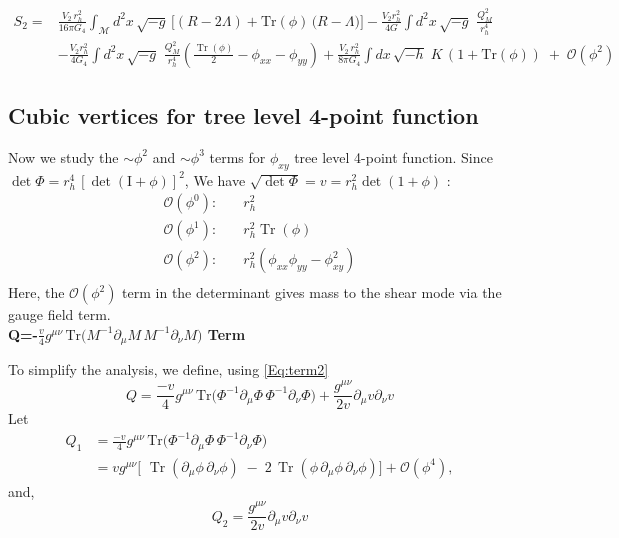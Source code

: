 \documentclass[a4paper,11pt]{article}
\DeclareMathOperator{\Tr}{Tr}
\begin{document}
\begin{equation}
\begin{aligned}
S_2={}&\frac{V_2\,r_h^2}{16\pi G_4}\int_{\mathcal M}d^2x\,\sqrt{-g}\,\Big[(R-2 \Lambda)+\text{Tr}(\phi)\,\Big(R-\Lambda\Big)\Big]-\frac{V_2 r_h^2}{4G}\int d^2x\,\sqrt{-g}\,\, \frac{Q_M^2}{r_h^4}
\\&-\frac{V_2 r_h^2}{4G_4}\int d^2x\,\sqrt{-g}\,\, \frac{Q_M^2}{r_h^4}(\frac{\Tr(\phi)}{2}-  \phi_{xx}-\phi_{yy})+\frac{V_2\,r_h^2}{8\pi G_4}\int dx\,\sqrt{-h}\;K\,(1+\text{Tr}(\phi))\;   +\;\mathcal O(\phi^2)
\end{aligned}
\label{eq:KK-S2-lin}
\end{equation}

\subsection{Cubic vertices for tree level 4-point function}

Now we study the $\sim\phi^2$ and $\sim\phi^3$ terms for $\phi_{xy}$ tree level 4-point function. Since $\det\Phi=r_h^4\,[\det(\mathrm{I}+\phi)]^2$, We have $\sqrt{\det\Phi}=v=r_h^2\det(1+\phi)$ :
\begin{align}
\mathcal O(\phi^0):&\quad r_h^2 \label{eq:KK-sqrtdet-0}\\[4pt]
\mathcal O(\phi^1):&\quad r_h^2 \Tr (\phi) \label{eq:KK-sqrtdet-1}\\[4pt]
\mathcal O(\phi^2):&\quad r_h^2\left(\phi_{xx}\phi_{yy}-\phi_{xy}^2\right) \label{eq:KK-sqrtdet-2}\\[4pt]
\end{align}
Here, the $\mathcal O (\phi^2)$  term in the determinant gives mass to the shear mode via the gauge field term.\\

\textbf{Q=-$\frac{v}{4}g^{\mu\nu}\,\text{Tr}\!\big(M^{-1}\partial_\mu M\,M^{-1}\partial_\nu M\big)$ Term}

To simplify the analysis, we define, using \ref{Eq:term2}
\begin{equation}
    Q= \frac{-v}{4}g^{\mu\nu}\,\text{Tr}\!\big(\Phi^{-1}\partial_\mu \Phi\,\Phi^{-1}\partial_\nu \Phi\big) +\frac{g^{\mu \nu} }{2v}\partial_\mu v \partial_\nu v
\end{equation}
Let 
\begin{equation}
\begin{aligned}
Q_1&=\frac{-v}{4}g^{\mu\nu}\,\text{Tr}\!\big(\Phi^{-1}\partial_\mu \Phi\,\Phi^{-1}\partial_\nu \Phi\big) \\&=v g^{\mu\nu}\Big[\,\,\Tr(\partial_\mu\phi\,\partial_\nu\phi)\;-\;2\,\Tr(\phi\,\partial_\mu\phi\,\partial_\nu\phi)\Big]+\mathcal O(\phi^4),
\label{eq:KK-kin}
\end{aligned}
\end{equation}
and,
\begin{equation}
Q_2=\frac{g^{\mu \nu} }{2v}\partial_\mu v \partial_\nu v
\end{equation}
\end{document}
